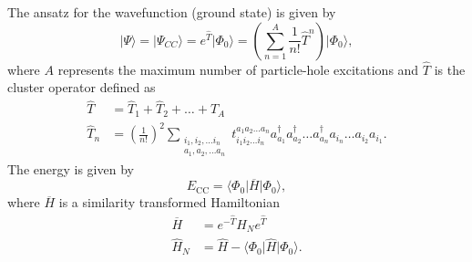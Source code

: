   The ansatz for the wavefunction (ground state) is given by
  \begin{equation}
     \vert \Psi\rangle = \vert \Psi_{CC}\rangle = e^{\hat{T}} \vert
     \Phi_0\rangle = \left( \sum_{n=1}^{A} \frac{1}{n!} \hat{T}^n
     \right) \vert \Phi_0\rangle,
  \end{equation}
  where $A$ represents the maximum number of particle-hole excitations
  and $\hat{T}$ is the cluster operator defined as
  \begin{align}
              \hat{T} &= \hat{T}_1 + \hat{T}_2 + \ldots + \hat{T}_A
              \\ \hat{T}_n &= \left(\frac{1}{n!}\right)^2
              \sum_{\substack{ i_1,i_2,\ldots i_n \\ a_1,a_2,\ldots
                  a_n}} t_{i_1i_2\ldots i_n}^{a_1a_2\ldots a_n}
              a_{a_1}^\dagger a_{a_2}^\dagger \ldots a_{a_n}^\dagger
              a_{i_n} \ldots a_{i_2} a_{i_1}.
          \end{align}
      The energy is given by
      \begin{equation}
          E_{\mathrm{CC}} = \langle\Phi_0\vert \overline{H}\vert
          \Phi_0\rangle,
      \end{equation}
      where $\overline{H}$ is a similarity transformed Hamiltonian
      \begin{align}
          \overline{H}&= e^{-\hat{T}} \hat{H}_N e^{\hat{T}}
          \\ \hat{H}_N &= \hat{H} - \langle\Phi_0\vert \hat{H} \vert
          \Phi_0\rangle.
      \end{align}

